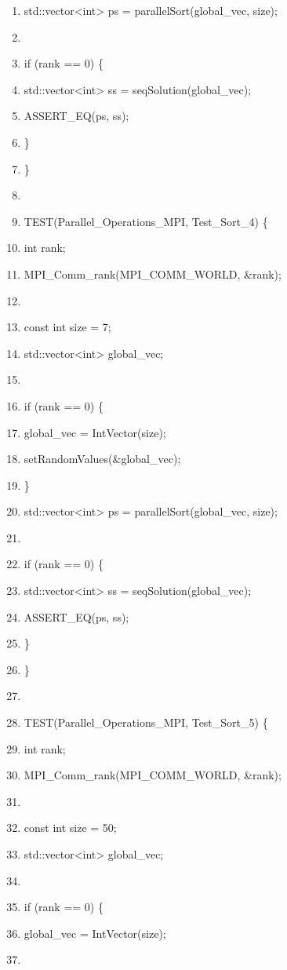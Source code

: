 \documentclass[]{article}
\begin{document}
\begin{enumerate}
\item
  std::vector\textless{}int\textgreater{} ps = parallelSort(global\_vec,
  size);
\item
\item
  if (rank == 0) \{
\item
  std::vector\textless{}int\textgreater{} ss = seqSolution(global\_vec);
\item
  ASSERT\_EQ(ps, ss);
\item
  \}
\item
  \}
\item
\item
  TEST(Parallel\_Operations\_MPI, Test\_Sort\_4) \{
\item
  int rank;
\item
  MPI\_Comm\_rank(MPI\_COMM\_WORLD, \&rank);
\item
\item
  const int size = 7;
\item
  std::vector\textless{}int\textgreater{} global\_vec;
\item
\item
  if (rank == 0) \{
\item
  global\_vec = IntVector(size);
\item
  setRandomValues(\&global\_vec);
\item
  \}
\item
  std::vector\textless{}int\textgreater{} ps = parallelSort(global\_vec,
  size);
\item
\item
  if (rank == 0) \{
\item
  std::vector\textless{}int\textgreater{} ss = seqSolution(global\_vec);
\item
  ASSERT\_EQ(ps, ss);
\item
  \}
\item
  \}
\item
\item
  TEST(Parallel\_Operations\_MPI, Test\_Sort\_5) \{
\item
  int rank;
\item
  MPI\_Comm\_rank(MPI\_COMM\_WORLD, \&rank);
\item
\item
  const int size = 50;
\item
  std::vector\textless{}int\textgreater{} global\_vec;
\item
\item
  if (rank == 0) \{
\item
  global\_vec = IntVector(size);
\item

\end{enumerate}
\end{document}
